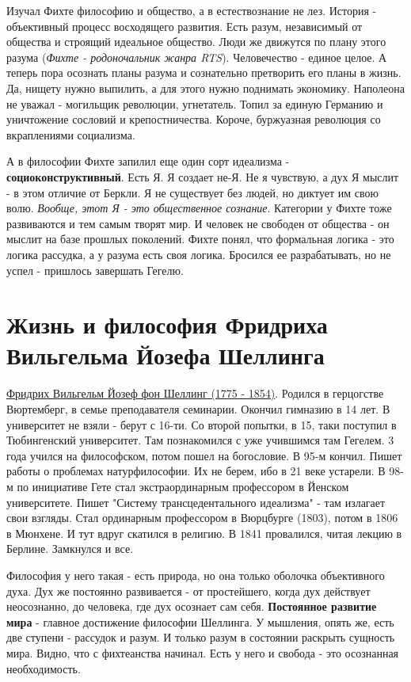 Изучал Фихте философию и общество, а в естествознание не лез. История - объективный процесс восходящего развития. Есть разум, независимый от общества и строящий идеальное общество. Люди же движутся по плану этого разума (\textit{Фихте - родоночальник жанра RTS}). Человечество - единое целое. А теперь пора осознать планы разума и сознательно претворить его планы в жизнь. Да, нищету нужно выпилить, а для этого нужно поднимать экономику. Наполеона не уважал - могильщик революции, угнетатель. Топил за единую Германию и уничтожение сословий и крепостничества. Короче, буржуазная революция со вкраплениями социализма.

А в философии Фихте запилил еще один сорт идеализма - \textbf{социоконструктивный}. Есть Я. Я создает не-Я. Не я чувствую, а дух Я мыслит - в этом отличие от Беркли. Я не существует без людей, но диктует им свою волю. \textit{Вообще, этот Я - это общественное сознание}. Категории у Фихте тоже развиваются и тем самым творят мир. И человек не свободен от общества - он мыслит на базе прошлых поколений. Фихте понял, что формальная логика - это логика рассудка, а у разума есть своя логика. Бросился ее разрабатывать, но не успел - пришлось завершать Гегелю.  

\section{Жизнь и философия Фридриха Вильгельма Йозефа Шеллинга}
\underline{Фридрих Вильгельм Йозеф фон Шеллинг (1775 - 1854)}. Родился в герцогстве Вюртемберг, в семье преподавателя семинарии. Окончил гимназию в 14 лет. В университет не взяли - берут с 16-ти. Со второй попытки, в 15, таки поступил в Тюбингенский университет. Там познакомился с уже учившимся там Гегелем. 3 года учился на философском, потом пошел на богословие. В 95-м кончил. Пишет работы о проблемах натурфилософии. Их не берем, ибо в 21 веке устарели. В 98-м по инициативе Гете стал экстраординарным профессором в Йенском университете. Пишет "Систему трансцедентального идеализма" - там излагает свои взгляды. Стал ординарным профессором в Вюрцбурге (1803), потом в 1806 в Мюнхене. И тут вдруг скатился в религию. В 1841 провалился, читая лекцию в Берлине. Замкнулся и все. 

Философия у него такая - есть природа, но она только оболочка объективного духа. Дух же постоянно развивается - от простейшего, когда дух действует неосознанно, до человека, где дух осознает сам себя. \textbf{Постоянное развитие мира} - главное достижение философии Шеллинга. У мышления, опять же, есть две ступени - рассудок и разум. И только разум в состоянии раскрыть сущность мира. Видно, что с фихтеанства начинал. Есть у него и свобода - это осознанная необходимость.

